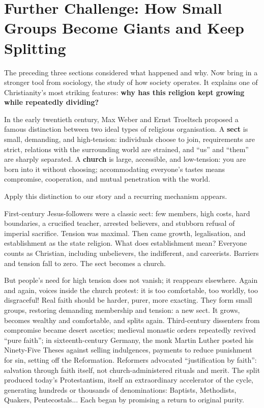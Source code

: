 \section[Further Challenge: Growth and Division]{Further Challenge: How Small Groups Become Giants and Keep Splitting}
The preceding three sections considered what happened and why. Now bring in a stronger tool from sociology, the study of how society operates. It explains one of Christianity's most striking features: \textbf{why has this religion kept growing while repeatedly dividing?}

In the early twentieth century, Max Weber and Ernst Troeltsch proposed a famous distinction between two ideal types of religious organisation. A \textbf{sect} is small, demanding, and high-tension: individuals choose to join, requirements are strict, relations with the surrounding world are strained, and ``us'' and ``them'' are sharply separated. A \textbf{church} is large, accessible, and low-tension: you are born into it without choosing; accommodating everyone's tastes means compromise, cooperation, and mutual penetration with the world.

Apply this distinction to our story and a recurring mechanism appears.

First-century Jesus-followers were a classic sect: few members, high costs, hard boundaries, a crucified teacher, arrested believers, and stubborn refusal of imperial sacrifice. Tension was maximal. Then came growth, legalisation, and establishment as the state religion. What does establishment mean? Everyone counts as Christian, including unbelievers, the indifferent, and careerists. Barriers and tension fall to zero. The sect becomes a church.

But people's need for high tension does not vanish; it reappears elsewhere. Again and again, voices inside the church protest: it is too comfortable, too worldly, too disgraceful! Real faith should be harder, purer, more exacting. They form small groups, restoring demanding membership and tension: a new sect. It grows, becomes wealthy and comfortable, and splits again. Third-century dissenters from compromise became desert ascetics; medieval monastic orders repeatedly revived ``pure faith''; in sixteenth-century Germany, the monk Martin Luther posted his Ninety-Five Theses against selling indulgences, payments to reduce punishment for sin, setting off the Reformation. Reformers advocated ``justification by faith'': salvation through faith itself, not church-administered rituals and merit. The split produced today's Protestantism, itself an extraordinary accelerator of the cycle, generating hundreds or thousands of denominations: Baptists, Methodists, Quakers, Pentecostals... Each began by promising a return to original purity.

